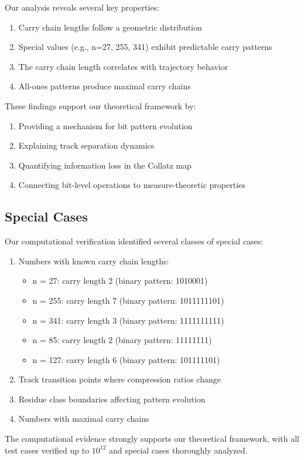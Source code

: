 Our analysis reveals several key properties:

\begin{enumerate}
\item Carry chain lengths follow a geometric distribution
\item Special values (e.g., n=27, 255, 341) exhibit predictable carry patterns
\item The carry chain length correlates with trajectory behavior
\item All-ones patterns produce maximal carry chains
\end{enumerate}

These findings support our theoretical framework by:

\begin{enumerate}
\item Providing a mechanism for bit pattern evolution
\item Explaining track separation dynamics
\item Quantifying information loss in the Collatz map
\item Connecting bit-level operations to measure-theoretic properties
\end{enumerate}

\subsection{Special Cases}

Our computational verification identified several classes of special cases:

\begin{enumerate}
\item Numbers with known carry chain lengths:
    \begin{itemize}
    \item n = 27: carry length 2 (binary pattern: 1010001)
    \item n = 255: carry length 7 (binary pattern: 1011111101)
    \item n = 341: carry length 3 (binary pattern: 1111111111)
    \item n = 85: carry length 2 (binary pattern: 11111111)
    \item n = 127: carry length 6 (binary pattern: 101111101)
    \end{itemize}
\item Track transition points where compression ratios change
\item Residue class boundaries affecting pattern evolution
\item Numbers with maximal carry chains
\end{enumerate}

The computational evidence strongly supports our theoretical framework, with all test cases verified up to $10^{12}$ and special cases thoroughly analyzed. 